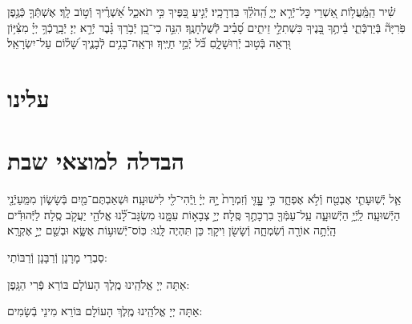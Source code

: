 \documentclass[twoside, openany, parskip=half, 11pt]{book}
\begin{document}
\sepline


שִׁ֗יר הַֽמַּֽ֫עֲל֥וֹת אַ֭שְׁרֵי כׇּל־יְֿרֵ֣א יְיָ֑ הַֽ֝הֹלֵ֗ךְ בִּדְרָכָֽיו׃
יְֿגִ֣יעַ כַּ֭פֶּיךָ כִּ֣י תֹאכֵ֑ל אַ֝שְׁרֶ֗יךָ וְֿט֣וֹב לָֽךְ׃
אֶשְׁתְּֿךָ֤ כְּֿגֶ֥פֶן פֹּֽרִיָּה֘ בְּֿיַרְכְּֿתֵ֢י בֵ֫יתֶ֥ךָ בָּ֭נֶיךָ כִּשְׁתִלֵ֣י זֵיתִ֑ים סָ֝בִ֗יב לְֿשֻׁלְחָנֶֽךָ׃
הִנֵּ֣ה כִי־כֵ֭ן יְֿבֹ֥רַךְ גָּ֗בֶר יְֿרֵ֣א יְיָ׃
יְֿבָֽרֶכְֿךָ֥ יְיָ֗ מִצִּ֫יּ֥וֹן וּ֭רְאֵה בְּֿט֣וּב יְֿרֽוּשָׁלָ֑םִ כֹּ֝֗ל יְֿמֵ֣י חַיֶּֽיךָ׃
וּרְאֵֽה־בָנִ֥ים לְֿבָנֶ֑יךָ שָׁ֝ל֗וֹם עַל־יִשְׂרָאֵֽל׃


\label{matzash_alienu}
\fullkaddish


\section*{ עלינו }


\aleinu

\vfill

\quad{}\quad{}

\clearpage

\section[הבדלה]{ הבדלה למוצאי שבת } \label{havdala}


\birkashabonim

\sepline


אֵ֧ל יְֿשֽׁוּעָתִ֛י אֶבְטַ֖ח וְֿלֹ֣א אֶפְחָ֑ד כִּ֣י עׇׇׇָזִּ֤י וְֿזִמְרָת֙ יָ֣הּ יְיָ֔ וַֽיְֿהִי־לִ֖י לִישׁוּעָֽה׃ וּשְׁאַבְתֶּם־מַ֖יִם בְּֿשָׂשׂ֑וֹן מִמַּֽעַיְֿנֵ֖י הַיְֿשׁוּעָֽה׃
לַֽיְֿיָ֥ הַיְֿשׁוּעָ֑ה עַֽל־עַמְּֿךָ֖ בִרְכָתֶ֣ךָ סֶּֽלָה׃
יְיָ֣ צְבָא֣וֹת עִמָּ֑נוּ מִשְׂגָּב־לָ֝֗נוּ אֱלֹהֵ֖י יַעֲקֹ֣ב סֶֽלָה׃
לַיְּֿהוּדִ֕ים הָֽיְֿתָ֥ה אוֹרָ֖ה וְֿשִׂמְחָ֑ה וְֿשָׂשׂ֖ן וִיקָֽר׃ כֵּן תִּהְיֶה לָּֽנוּ: כּֽוֹס־יְֿשׁוּע֥וֹת אֶשָּׂ֑א וּבְשֵׁ֖ם יְיָ֣ אֶקְרָֽא׃


\begin{scriptsize}
סַבְרֵי מָרָנָן וְֿרַבָּנָן וְֿרַבּוֹתַי: \\
\end{scriptsize}
אַתָּה יְיָ אֱלֹהֵֽינוּ מֶֽלֶךְ הָעוֹלָם בּוֹרֵא פְּֿרִי הַגָּֽפֶן:

אַתָּה יְיָ אֱלֹהֵֽינוּ מֶֽלֶךְ הָעוֹלָם בּוֹרֵא מִינֵי בְֿשָׂמִים:
\end{document}
